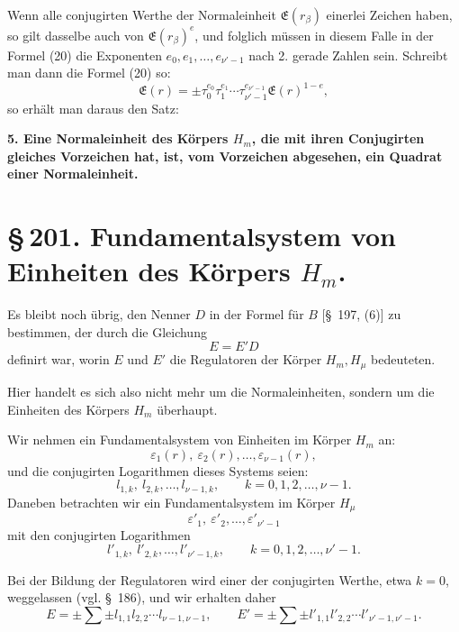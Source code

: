 \documentclass[11pt]{article}
\begin{document}
Wenn alle conjugirten Werthe der Normaleinheit $\mathfrak E(r_\beta)$ einerlei Zeichen haben, so gilt dasselbe auch von $\mathfrak E(r_\beta)^e$, und folglich müssen in diesem Falle in der Formel (20) die Exponenten $e_0,e_1,\ldots,e_{\nu'-1}$ nach 2. gerade Zahlen sein. Schreibt man dann die Formel (20) so:
\[
\mathfrak E(r)=\pm\tau_0^{e_0}\tau_1^{e_1}\cdots\tau_{\nu'-1}^{e_{\nu'-1}}\mathfrak E(r)^{1-e},
\]
so erhält man daraus den Satz:

\begin{center}\textbf{5. Eine Normaleinheit des Körpers $H_m$, die mit ihren Conjugirten gleiches Vorzeichen hat, ist, vom Vorzeichen abgesehen, ein Quadrat einer Normaleinheit.}\end{center}

\section*{\S\,201. Fundamentalsystem von Einheiten des Körpers $H_m$.}

Es bleibt noch übrig, den Nenner $D$ in der Formel für $B$ [\S~197, (6)] zu bestimmen, der durch die Gleichung
\[
E=E'D
\]
definirt war, worin $E$ und $E'$ die Regulatoren der Körper $H_m,H_\mu$ bedeuteten.

Hier handelt es sich also nicht mehr um die Normaleinheiten, sondern um die Einheiten des Körpers $H_m$ überhaupt.

Wir nehmen ein Fundamentalsystem von Einheiten im Körper $H_m$ an:
\begin{equation}
\varepsilon_1(r),\ \varepsilon_2(r),\ldots,\varepsilon_{\nu-1}(r),
\tag{1}
\end{equation}
und die conjugirten Logarithmen dieses Systems seien:
\begin{equation}
l_{1,k},\ l_{2,k},\ldots,l_{\nu-1,k},\qquad k=0,1,2,\ldots,\nu-1.
\tag{2}
\end{equation}
Daneben betrachten wir ein Fundamentalsystem im Körper $H_\mu$
\begin{equation}
\varepsilon'_1,\ \varepsilon'_2,\ldots,\varepsilon'_{\nu'-1}
\tag{3}
\end{equation}
mit den conjugirten Logarithmen
\begin{equation}
l'_{1,k},\ l'_{2,k},\ldots,l'_{\nu'-1,k},\qquad k=0,1,2,\ldots,\nu'-1.
\tag{4}
\end{equation}

Bei der Bildung der Regulatoren wird einer der conjugirten Werthe, etwa $k=0$, weggelassen (vgl. \S~186), und wir erhalten daher
\begin{equation}
E=\pm\sum\pm l_{1,1}l_{2,2}\cdots l_{\nu-1,\nu-1},
\qquad
E'=\pm\sum\pm l'_{1,1}l'_{2,2}\cdots l'_{\nu'-1,\nu'-1}.
\tag{5}
\end{equation}
\end{document}
